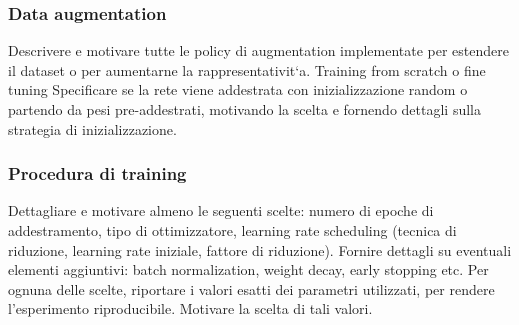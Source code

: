 \subsubsection{Data augmentation}
Descrivere e motivare tutte le policy di augmentation
implementate per estendere il dataset o per aumentarne la rappresentativit`a.
Training from scratch o fine tuning Specificare se la rete viene addestrata
con inizializzazione random o partendo da pesi pre-addestrati, motivando la
scelta e fornendo dettagli sulla strategia di inizializzazione.

\subsubsection{Procedura di training}
Dettagliare e motivare almeno le seguenti scelte: numero di epoche di addestramento, tipo di ottimizzatore, learning rate scheduling (tecnica di riduzione, learning rate iniziale, fattore di riduzione). Fornire dettagli su eventuali elementi aggiuntivi: batch normalization, weight decay, early stopping etc. Per ognuna delle scelte, riportare i valori esatti dei parametri utilizzati, per rendere l’esperimento riproducibile. Motivare la scelta di tali valori.